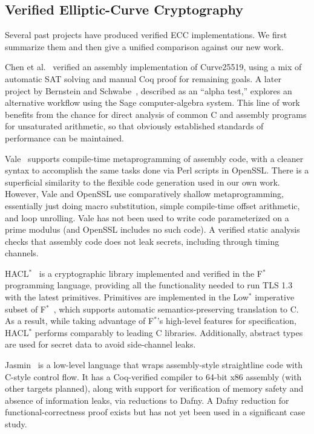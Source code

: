 \documentclass[conference,letterpaper]{IEEEtran}
\begin{document}

\subsection{Verified Elliptic-Curve Cryptography}

Several past projects have produced verified ECC implementations.
We first summarize them and then give a unified comparison against our new work.

Chen et al.~\cite{verif25519} verified an assembly implementation of Curve25519, using a mix of automatic SAT solving and manual Coq proof for remaining goals.
A later project by Bernstein and Schwabe~\cite{gfverif}, described as an ``alpha test,'' explores an alternative workflow using the Sage computer-algebra system.
This line of work benefits from the chance for direct analysis of common C and assembly programs for unsaturated arithmetic, so that obviously established standards of performance can be maintained.

Vale~\cite{vale} supports compile-time metaprogramming of assembly code, with a cleaner syntax to accomplish the same tasks done via Perl scripts in OpenSSL.
There is a superficial similarity to the flexible code generation used in our own work.
However, Vale and OpenSSL use comparatively shallow metaprogramming, essentially just doing macro substitution, simple compile-time offset arithmetic, and loop unrolling.
Vale has not been used to write code parameterized on a prime modulus (and OpenSSL includes no such code).
A verified static analysis checks that assembly code does not leak secrets, including through timing channels.

HACL$^*$~\cite{hacl} is a cryptographic library implemented and verified in the F$^*$ programming language, providing all the functionality needed to run TLS 1.3 with the latest primitives.
Primitives are implemented in the Low$^*$ imperative subset of F$^*$~\cite{kremlin}, which supports automatic semantics-preserving translation to C.
As a result, while taking advantage of F$^*$'s high-level features for specification, HACL$^*$ performs comparably to leading C libraries.
Additionally, abstract types are used for secret data to avoid side-channel leaks.

Jasmin~\cite{jasmin} is a low-level language that wraps assembly-style straightline code with C-style control flow.
It has a Coq-verified compiler to 64-bit x86 assembly (with other targets planned), along with support for verification of memory safety and absence of information leaks, via reductions to Dafny.
A Dafny reduction for functional-correctness proof exists but has not yet been used in a significant case study.
\end{document}
